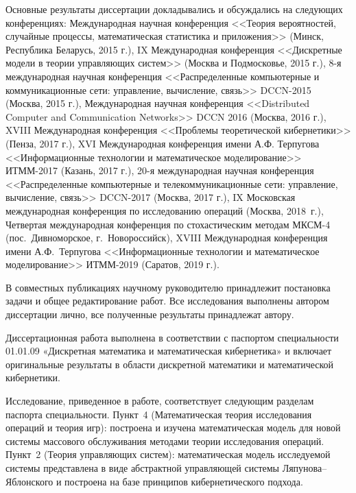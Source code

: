 Основные результаты диссертации докладывались и обсуждались на следующих  конференциях: Международная научная конференция <<Теория вероятностей, случайные процессы, математическая статистика и приложения>> (Минск, Республика Беларусь, 2015 г.), IX Международная конференция <<Дискретные модели в теории управляющих систем>> (Москва и Подмосковье, 2015 г.), 8-я международная научная конференция <<Распределенные компьютерные и коммуникационные сети: управление, вычисление, связь>> DCCN-2015 (Москва, 2015 г.), Международная научная конференция <<Distributed Computer and Communication Networks>> DCCN 2016 (Москва, 2016 г.), XVIII Международная конференция <<Проблемы теоретической кибернетики>> (Пенза, 2017 г.), XVI Международная конференция имени А.Ф. Терпугова <<Информационные технологии и математическое моделирование>> ИТММ-2017 (Казань, 2017 г.), 20-я международная научная конференция <<Распределенные компьютерные и телекоммуникационные сети: управление, вычисление, связь>> DCCN-2017 (Москва, 2017 г.), IX Московская международная конференция по исследованию операций (Москва, 2018~г.), Четвертая международная конференция по стохастическим методам МКСМ-4 (пос.~Дивноморское, г.~Новороссийск), XVIII Международная конференция имени А.Ф.~Терпугова <<Информационные технологии и математическое моделирование>> ИТММ-2019 (Саратов, 2019 г.).




{\contribution}  В совместных публикациях научному руководителю принадлежит постановка задачи и общее редактирование работ. Все исследования выполнены автором диссертации лично, все полученные результаты принадлежат автору. 

{\passport} Диссертационная работа выполнена в соответствии с паспортом специальности 01.01.09 «Дискретная математика и математическая кибернетика» и включает оригинальные результаты в области дискретной математики и математической кибернетики. 

Исследование, приведенное в работе, соответствует следующим
разделам паспорта специальности. Пункт~4 (Математическая теория исследования операций и теория игр): построена и изучена математическая модель для новой системы массового обслуживания методами теории исследования операций. Пункт~2 (Теория управляющих систем): математическая модель исследуемой системы представлена в виде абстрактной управляющей системы Ляпунова--Яблонского и построена на базе принципов кибернетического подхода.


